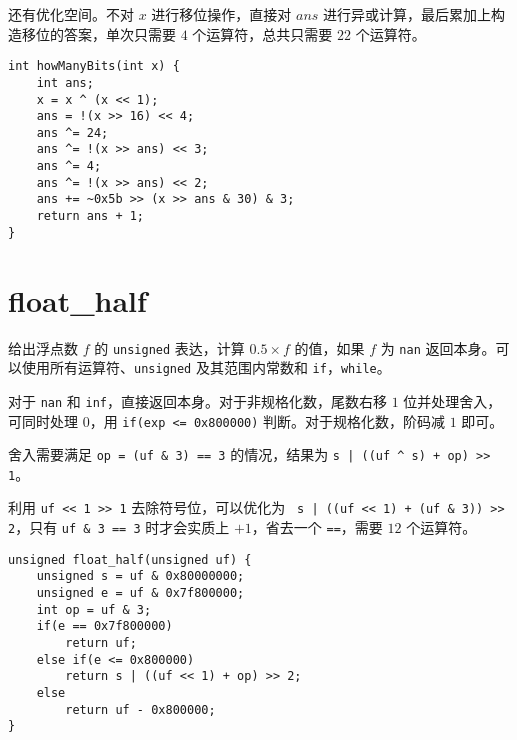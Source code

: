 \documentclass{noithesis}
\begin{document}
	还有优化空间。不对 $x$ 进行移位操作，直接对 $ans$ 进行异或计算，最后累加上构造移位的答案，单次只需要 $4$ 个运算符，总共只需要 $22$ 个运算符。
	
\begin{lstlisting}
int howManyBits(int x) {
	int ans;
	x = x ^ (x << 1);
	ans = !(x >> 16) << 4;
	ans ^= 24;
	ans ^= !(x >> ans) << 3;
	ans ^= 4;
	ans ^= !(x >> ans) << 2;
	ans += ~0x5b >> (x >> ans & 30) & 3;
	return ans + 1;
}
\end{lstlisting}
	
	\section{float\_half}
	
	给出浮点数 $f$ 的 \verb|unsigned| 表达，计算 $0.5\times f$ 的值，如果 $f$ 为 \verb|nan| 返回本身。可以使用所有运算符、\verb|unsigned| 及其范围内常数和 \verb|if|，\verb|while|。
	
	对于 \verb|nan| 和 \verb|inf|，直接返回本身。对于非规格化数，尾数右移 $1$ 位并处理舍入，可同时处理 $0$，用 \verb|if(exp <= 0x800000)| 判断。对于规格化数，阶码减 $1$ 即可。
	
	舍入需要满足 \verb|op = (uf & 3) == 3| 的情况，结果为 \verb!s | ((uf ^ s) + op) >> 1!。
	
	利用 \verb|uf << 1 >> 1| 去除符号位，可以优化为 \verb! s | ((uf << 1) + (uf & 3)) >> 2!，只有 \verb|uf & 3 == 3| 时才会实质上 $+1$，省去一个 \verb|==|，需要 $12$ 个运算符。
\begin{lstlisting}
unsigned float_half(unsigned uf) {
	unsigned s = uf & 0x80000000;
	unsigned e = uf & 0x7f800000;
	int op = uf & 3;
	if(e == 0x7f800000)
		return uf;
	else if(e <= 0x800000)
		return s | ((uf << 1) + op) >> 2;
	else
		return uf - 0x800000;
}
\end{lstlisting}
	
\end{document}
